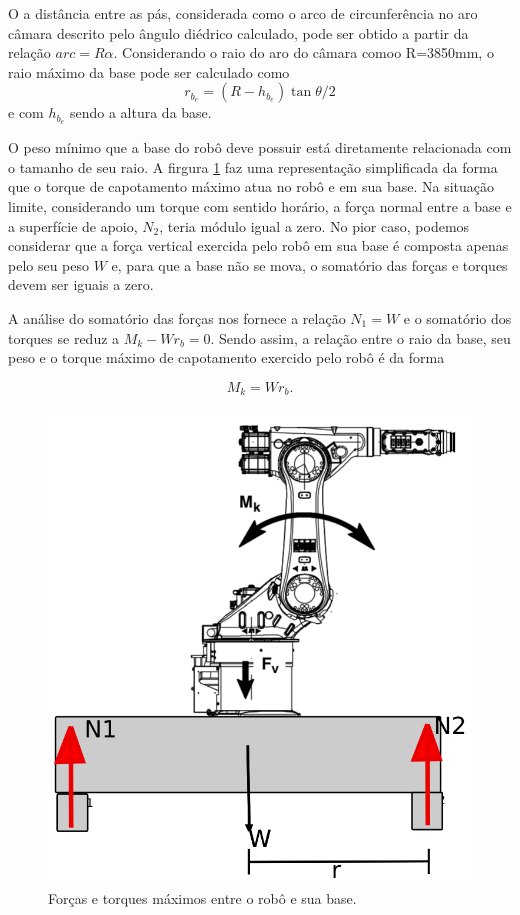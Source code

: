 O a distância entre as pás, considerada como o arco de circunferência no aro
câmara descrito pelo ângulo diédrico calculado, pode ser obtido a partir da
relação $arc=R\alpha$.
Considerando o raio do aro do câmara comoo R=3850mm, o raio máximo da base pode
ser calculado como $$r_{b_e} = (R - h_{b_e})\tan{\theta/2}$$ e com $h_{b_e}$
sendo a altura da base.

O peso mínimo que a base do robô deve possuir está diretamente relacionada com o
tamanho de seu raio. A firgura \ref{fig::tilt_robot} faz uma representação
simplificada da forma que o torque de capotamento máximo atua no robô e em sua
base. Na situação limite, considerando um torque com sentido horário, a força
normal entre a base e a superfície de apoio, $N_2$, teria módulo igual a zero.
No pior caso, podemos considerar que a força vertical exercida pelo robô em sua
base é composta apenas pelo seu peso $W$ e, para que a base não se mova, o
somatório das forças e torques devem ser iguais a zero.

A análise do somatório das forças nos fornece a relação $N_1=W$  e o somatório
dos torques se reduz a $M_k-Wr_b=0$. Sendo assim, a relação entre o raio da base, seu 
peso e o torque máximo de capotamento exercido pelo robô é
da forma 

$$M_k=Wr_b.$$

\begin{figure}[h!]
\centering
	\includegraphics[width=0.9\columnwidth]{sota/figs/base/tilt}
	\caption{Forças e torques máximos entre o robô e sua base.}
	\label{fig::tilt_robot}
\end{figure}

